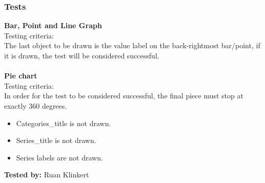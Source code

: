 \documentclass[a4paper,12pt]{article}
\begin{document}
\subsubsection{Tests}
\textbf{Bar, Point and Line Graph}\\
Testing criteria:\\
The last object to be drawn is the value label on the back-rightmost bar/point, if it is drawn, the test will be considered successful.\\\\
%
\textbf{Pie chart}\\
Testing criteria:\\
In order for the test to be considered successful, the final piece must stop at exactly 360 degrees.
%
\begin{itemize}
	\item Categories\_title is not drawn.
	\item Series\_title is not drawn. 
	\item Series labels are not drawn.
\end{itemize}
%
\textbf{Tested by:} Ruan Klinkert
%
\end{document}

